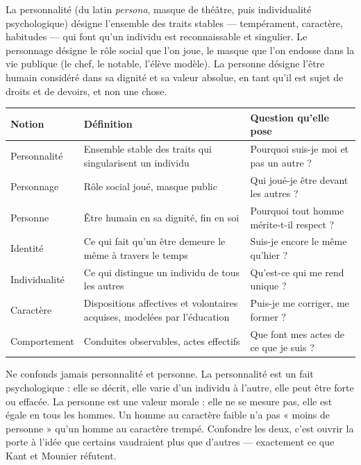 \documentclass[11pt]{article}
\newcommand{\cle}[1]{{\popxbold\color{popdark}#1}}
\begin{document}
\begin{definition}
La \cle{personnalité} (du latin \emph{persona}, masque de théâtre, puis individualité psychologique) désigne l'ensemble des traits stables — tempérament, caractère, habitudes — qui font qu'un individu est reconnaissable et singulier. Le \cle{personnage} désigne le rôle social que l'on joue, le masque que l'on endosse dans la vie publique (le chef, le notable, l'élève modèle). La \cle{personne} désigne l'être humain considéré dans sa dignité et sa valeur absolue, en tant qu'il est sujet de droits et de devoirs, et non une chose.
\end{definition}

\begin{center}
\begin{tabularx}{\linewidth}{|l|X|X|}
\hline
\rowcolor{popblueL} \textbf{Notion} & \textbf{Définition} & \textbf{Question qu'elle pose} \\
\hline
Personnalité & Ensemble stable des traits qui singularisent un individu & Pourquoi suis-je moi et pas un autre ? \\
\hline
Personnage & Rôle social joué, masque public & Qui joué-je être devant les autres ? \\
\hline
Personne & Être humain en sa dignité, fin en soi & Pourquoi tout homme mérite-t-il respect ? \\
\hline
Identité & Ce qui fait qu'un être demeure le même à travers le temps & Suis-je encore le même qu'hier ? \\
\hline
Individualité & Ce qui distingue un individu de tous les autres & Qu'est-ce qui me rend unique ? \\
\hline
Caractère & Dispositions affectives et volontaires acquises, modelées par l'éducation & Puis-je me corriger, me former ? \\
\hline
Comportement & Conduites observables, actes effectifs & Que font mes actes de ce que je suis ? \\
\hline
\end{tabularx}
\end{center}

\begin{attention}
Ne confonds jamais \cle{personnalité} et \cle{personne}. La personnalité est un fait psychologique : elle se décrit, elle varie d'un individu à l'autre, elle peut être forte ou effacée. La personne est une valeur morale : elle ne se mesure pas, elle est égale en tous les hommes. Un homme au caractère faible n'a pas « moins de personne » qu'un homme au caractère trempé. Confondre les deux, c'est ouvrir la porte à l'idée que certains vaudraient plus que d'autres — exactement ce que Kant et Mounier réfutent.
\end{attention}
\end{document}
